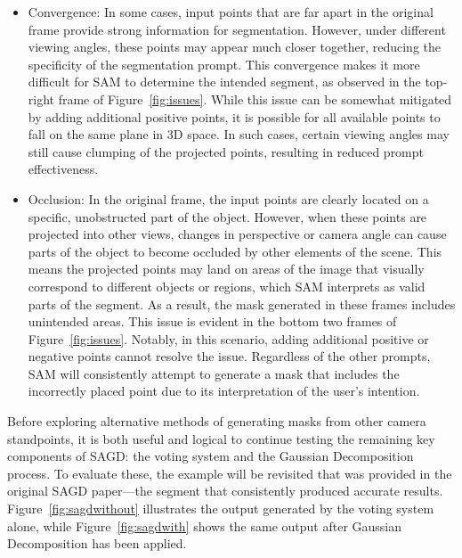 \documentclass[12pt]{article}
\begin{document}
\begin{itemize}
	\item Convergence: In some cases, input points that are far apart in the original frame provide strong information for segmentation. However, under different viewing angles, these points may appear much closer together, reducing the specificity of the segmentation prompt. This convergence makes it more difficult for SAM to determine the intended segment, as observed in the top-right frame of Figure~\ref{fig:issues}. While this issue can be somewhat mitigated by adding additional positive points, it is possible for all available points to fall on the same plane in 3D space. In such cases, certain viewing angles may still cause clumping of the projected points, resulting in reduced prompt effectiveness.
	\item Occlusion: In the original frame, the input points are clearly located on a specific, unobstructed part of the object. However, when these points are projected into other views, changes in perspective or camera angle can cause parts of the object to become occluded by other elements of the scene. This means the projected points may land on areas of the image that visually correspond to different objects or regions, which SAM interprets as valid parts of the segment. As a result, the mask generated in these frames includes unintended areas. This issue is evident in the bottom two frames of Figure~\ref{fig:issues}. Notably, in this scenario, adding additional positive or negative points cannot resolve the issue. Regardless of the other prompts, SAM will consistently attempt to generate a mask that includes the incorrectly placed point due to its interpretation of the user’s intention.
\end{itemize}
Before exploring alternative methods of generating masks from other camera standpoints, it is both useful and logical to continue testing the remaining key components of SAGD: the voting system and the Gaussian Decomposition process. To evaluate these, the example will be revisited that was provided in the original SAGD paper—the segment that consistently produced accurate results. Figure~\ref{fig:sagdwithout} illustrates the output generated by the voting system alone, while Figure~\ref{fig:sagdwith} shows the same output after Gaussian Decomposition has been applied.
\end{document}
